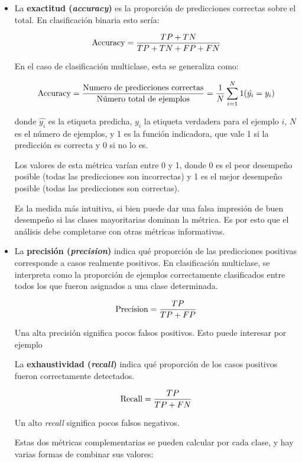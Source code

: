 \begin{itemize}
    \item La \textbf{exactitud (\textit{accuracy})} es la proporción de predicciones correctas sobre el total.
    En clasificación binaria esto sería:
    
    $$
    \textnormal{Accuracy} = \frac{TP+TN}{TP+TN+FP+FN}
    $$

    En el caso de clasificación multiclase, esta se generaliza como:

    $$
    \textnormal{Accuracy} = 
        \frac{\textnormal{Numero de predicciones correctas}}{\textnormal{Número total de ejemplos}} =
        \frac{1}{N} \sum_{i=1}^N1(\hat{y_i}=y_i)
    $$

    donde $\hat{y_i}$ es la etiqueta predicha, $y_i$ la etiqueta verdadera para el ejemplo $i$, $N$ es el 
    número de ejemplos, y 1 es la función indicadora, que vale 1 si la predicción es correcta y 0 si no 
    lo es. 

    Los valores de esta métrica varían entre 0 y 1, donde 0 es el peor desempeño posible (todas las 
    predicciones son incorrectas) y 1 es el mejor desempeño posible (todas las predicciones son correctas).

    Es la medida más intuitiva, si bien puede dar una falsa impresión de buen desempeño si las clases 
    mayoritarias dominan la métrica. Es por esto que el análisis debe completarse con otras métricas 
    informativas. 


    \item La \textbf{precisión (\textit{precision})} indica qué proporción de las predicciones positivas 
    corresponde a casos realmente positivos. En clasificación multiclase, se interpreta como la proporción de 
    ejemplos correctamente clasificados entre todos los que fueron asignados a una clase determinada. 

    $$
    \textnormal{Precision} = \frac{TP}{TP+FP}
    $$

    Una alta precisión significa pocos falsos positivos. Esto puede interesar por ejemplo

    La \textbf{exhaustividad (\textit{recall})} indica qué proporción de los casos positivos fueron 
    correctamente detectados.

    $$
    \textnormal{Recall} = \frac{TP}{TP+FN} 
    $$

    Un alto \textit{recall} significa pocos falsos negativos. 

    
    Estas dos métricas complementarias se pueden calcular por cada clase, y hay varias formas de combinar sus
    valores:


\end{itemize}
